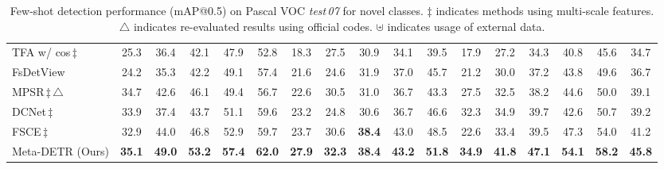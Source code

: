 \documentclass[letterpaper]{article} \usepackage{aaai22}  \usepackage{times}  \usepackage{helvet}  \usepackage{courier}  \usepackage[hyphens]{url}  \usepackage{graphicx} \urlstyle{rm} \def\UrlFont{\rm}  \usepackage{natbib}  \usepackage{caption} \DeclareCaptionStyle{ruled}{labelfont=normalfont,labelsep=colon,strut=off} \frenchspacing  \setlength{\pdfpagewidth}{8.5in}  \setlength{\pdfpageheight}{11in}  \usepackage{algorithm}
\begin{document}
\begin{table*}[t]
\begin{center}
{\begin{tabular}[t]{l|ccccc|ccccc|ccccc|c}
TFA w/ cos\;\cite{fsdet}\,$\ddag$ & 25.3 & 36.4 & 42.1 & 47.9 & 52.8 & 18.3 & 27.5 & 30.9 & 34.1 & 39.5 & 17.9 & 27.2 & 34.3 & 40.8 & 45.6 & 34.7 \\

FsDetView\;\cite{FSDetView} & 24.2 & 35.3 & 42.2 & 49.1 & 57.4 & 21.6 & 24.6 & 31.9 & 37.0 & 45.7 & 21.2 & 30.0 & 37.2 & 43.8 & 49.6 & 36.7 \\

MPSR\;\cite{MPSR}\,$\ddag\,{\triangle}$ & 34.7 & 42.6 & 46.1 & 49.4 & 56.7 & 22.6 & 30.5 & 31.0 & 36.7 & 43.3 & 27.5 & 32.5 & 38.2 & 44.6 & 50.0 & 39.1 \\

DCNet\;\cite{DenseRelationDistillation}\,$\ddag$ & 33.9 & 37.4 & 43.7 & 51.1 & 59.6 & 23.2 & 24.8 & 30.6 & 36.7 & 46.6 & 32.3 & 34.9 & 39.7 & 42.6 & 50.7 & 39.2 \\

FSCE\;\cite{fsce}\,$\ddag$ & 32.9 & 44.0 & 46.8 & 52.9 & 59.7 & 23.7 & 30.6 & \textbf{38.4} & 43.0 & 48.5 & 22.6 & 33.4 & 39.5 & 47.3 & 54.0 & 41.2 \\

\rowcolor{black!6} Meta-DETR (Ours) & \textbf{35.1} & \textbf{49.0} & \textbf{53.2} & \textbf{57.4} & \textbf{62.0} & \textbf{27.9} & \textbf{32.3} & \textbf{38.4} & \textbf{43.2} & \textbf{51.8} & \textbf{34.9} & \textbf{41.8} & \textbf{47.1} & \textbf{54.1} & \textbf{58.2} & \textbf{45.8} \\


\bottomrule[1.1pt]
\end{tabular}}
\end{center}
\vspace*{-3.99mm}
\caption{Few-shot detection performance (mAP@0.5) on Pascal VOC \textit{test\,07} for novel classes. $\ddag$ indicates methods using multi-scale features. $\triangle$ indicates re-evaluated results using official codes. $\uplus$ indicates usage of external data.}
\label{tab:Performance_VOC_novel}
\vspace*{-1.5mm}
\end{table*}
\end{document}
